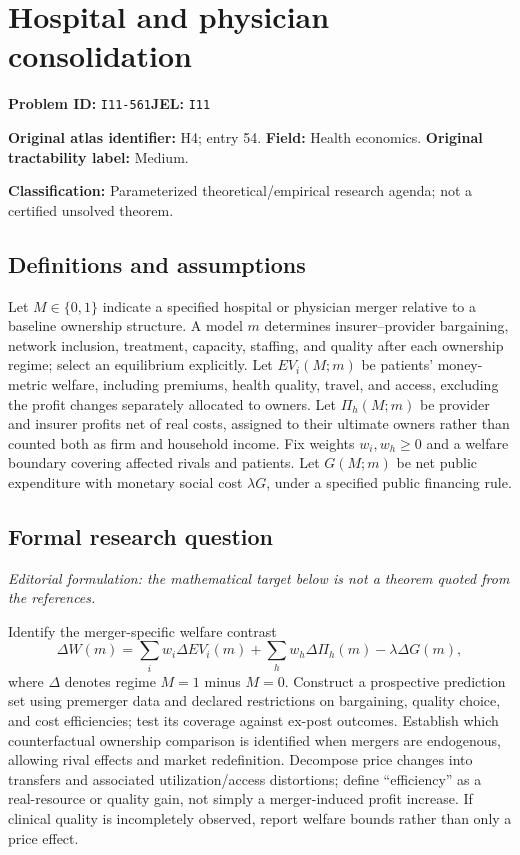 \documentclass[11pt,a4paper]{article}
\begin{document}
\section*{Hospital and physician consolidation}
\textbf{Problem ID:} \texttt{I11-561}\quad \textbf{JEL:} \texttt{I11}\par
\label{problem:OP-0054}
\label{atlas:prob:H4}
\noindent\textbf{Original atlas identifier:} H4; entry 54. \textbf{Field:} Health economics. \textbf{Original tractability label:} Medium.

\noindent\textbf{Classification:} Parameterized theoretical/empirical research agenda; not a certified unsolved theorem.

\subsection*{Definitions and assumptions}
Let $M\in\{0,1\}$ indicate a specified hospital or physician merger relative to a baseline ownership structure. A model $m$ determines insurer--provider bargaining, network inclusion, treatment, capacity, staffing, and quality after each ownership regime; select an equilibrium explicitly. Let $EV_i(M;m)$ be patients' money-metric welfare, including premiums, health quality, travel, and access, excluding the profit changes separately allocated to owners. Let $\Pi_h(M;m)$ be provider and insurer profits net of real costs, assigned to their ultimate owners rather than counted both as firm and household income. Fix weights $w_i,w_h\geq0$ and a welfare boundary covering affected rivals and patients. Let $G(M;m)$ be net public expenditure with monetary social cost $\lambda G$, under a specified public financing rule.

\subsection*{Formal research question}
\emph{Editorial formulation: the mathematical target below is not a theorem quoted from the references.}

Identify the merger-specific welfare contrast
\[
 \Delta W(m)=\sum_iw_i\Delta EV_i(m)+\sum_hw_h\Delta\Pi_h(m)-\lambda\Delta G(m),
\]
where $\Delta$ denotes regime $M=1$ minus $M=0$. Construct a prospective prediction set using premerger data and declared restrictions on bargaining, quality choice, and cost efficiencies; test its coverage against ex-post outcomes. Establish which counterfactual ownership comparison is identified when mergers are endogenous, allowing rival effects and market redefinition. Decompose price changes into transfers and associated utilization/access distortions; define “efficiency” as a real-resource or quality gain, not simply a merger-induced profit increase. If clinical quality is incompletely observed, report welfare bounds rather than only a price effect.
\end{document}

